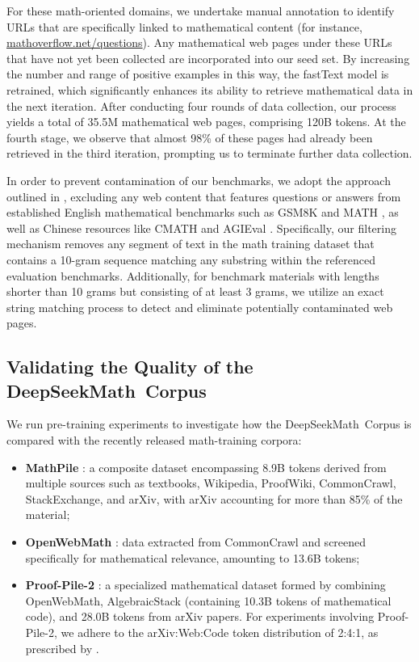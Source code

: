 \begin{itemize}[topsep=0pt]
For these math-oriented domains, we undertake manual annotation to identify URLs that are specifically linked to mathematical content (for instance, \url{mathoverflow.net/questions}). Any mathematical web pages under these URLs that have not yet been collected are incorporated into our seed set. By increasing the number and range of positive examples in this way, the fastText model is retrained, which significantly enhances its ability to retrieve mathematical data in the next iteration. After conducting four rounds of data collection, our process yields a total of 35.5M mathematical web pages, comprising 120B tokens. At the fourth stage, we observe that almost 98\% of these pages had already been retrieved in the third iteration, prompting us to terminate further data collection.

In order to prevent contamination of our benchmarks, we adopt the approach outlined in \cite{deepseek-coder}, excluding any web content that features questions or answers from established English mathematical benchmarks such as GSM8K \citep{gsm8k} and MATH \citep{MATH}, as well as Chinese resources like CMATH \citep{wei2023cmath} and AGIEval \citep{agieval}. Specifically, our filtering mechanism removes any segment of text in the math training dataset that contains a 10-gram sequence matching any substring within the referenced evaluation benchmarks. Additionally, for benchmark materials with lengths shorter than 10 grams but consisting of at least 3 grams, we utilize an exact string matching process to detect and eliminate potentially contaminated web pages.

\subsection{Validating the Quality of the DeepSeekMath~Corpus}

We run pre-training experiments to investigate how the DeepSeekMath~Corpus is compared with the recently released math-training corpora:

\begin{itemize}[topsep=0pt]
    \item \textbf{MathPile} \citep{mathpile}: a composite dataset encompassing 8.9B tokens derived from multiple sources such as textbooks, Wikipedia, ProofWiki, CommonCrawl, StackExchange, and arXiv, with arXiv accounting for more than 85\% of the material;
    \item \textbf{OpenWebMath} \citep{openwebmath}: data extracted from CommonCrawl and screened specifically for mathematical relevance, amounting to 13.6B tokens;
    \item \textbf{Proof-Pile-2} \citep{llemma}: a specialized mathematical dataset formed by combining OpenWebMath, AlgebraicStack (containing 10.3B tokens of mathematical code), and 28.0B tokens from arXiv papers. For experiments involving Proof-Pile-2, we adhere to the arXiv:Web:Code token distribution of 2:4:1, as prescribed by \cite{llemma}.
\end{itemize}


\end{itemize}

